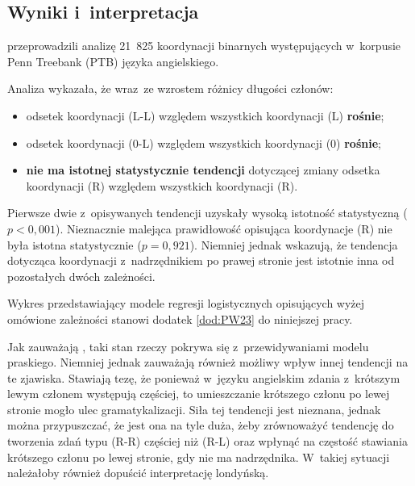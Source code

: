 





\subsection{Wyniki i~interpretacja}

\cite{przepiorkowski2023conjunct} przeprowadzili analizę 21~825 koordynacji binarnych występujących w~korpusie Penn Treebank (PTB) języka angielskiego.

Analiza wykazała, że wraz~ze wzrostem różnicy długości członów:
\begin{itemize}
\item odsetek koordynacji (L-L) względem wszystkich koordynacji (L) \textbf{rośnie};
\item odsetek koordynacji (0-L) względem wszystkich koordynacji (0) \textbf{rośnie};
\item \textbf{nie ma istotnej statystycznie tendencji} dotyczącej zmiany odsetka koordynacji (R) względem wszystkich koordynacji (R).
\end{itemize}

Pierwsze dwie z~opisywanych tendencji uzyskały wysoką istotność statystyczną ($p<0{,}001$). Nieznacznie malejąca prawidłowość opisująca koordynacje (R) nie była istotna statystycznie ($p = 0{,}921$). Niemniej jednak \cite{przepiorkowski2023conjunct} wskazują, że tendencja dotycząca koordynacji z~nadrzędnikiem po prawej stronie jest istotnie inna od pozostałych dwóch zależności. 

Wykres przedstawiający modele regresji logistycznych opisujących wyżej omówione zależności stanowi dodatek \ref{dod:PW23} do niniejszej pracy.

Jak zauważają \cite{przepiorkowski2023conjunct}, taki stan rzeczy pokrywa się z~przewidywaniami modelu praskiego. Niemniej jednak zauważają również możliwy wpływ innej tendencji na te zjawiska. Stawiają tezę, że ponieważ w~języku angielskim zdania z~krótszym lewym członem występują częściej, to umieszczanie krótszego członu po lewej stronie mogło ulec gramatykalizacji. Siła tej tendencji jest nieznana, jednak można przypuszczać, że jest ona na tyle duża, żeby zrównoważyć tendencję do tworzenia zdań typu (R-R) częściej niż (R-L) oraz wpłynąć na częstość stawiania krótszego członu po lewej stronie, gdy nie ma nadrzędnika. W~takiej sytuacji należałoby również dopuścić interpretację londyńską.

